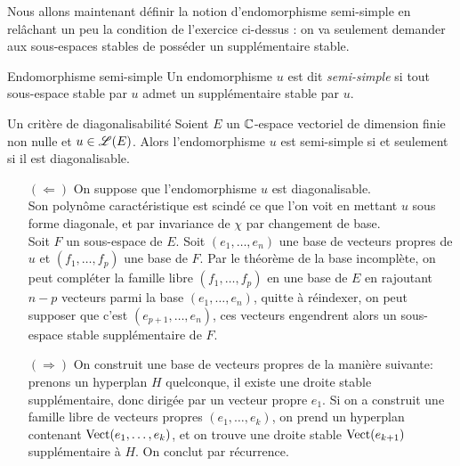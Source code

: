 Nous allons maintenant définir la notion d'endomorphisme semi-simple en relâchant un peu la
condition de l'exercice ci-dessus : on va seulement demander aux sous-espaces stables de posséder
un supplémentaire stable.

\begin{defi}{Endomorphisme semi-simple}
    Un endomorphisme $u$ est dit \emph{semi-simple} si tout sous-espace stable par $u$ admet un supplémentaire stable par $u$.
\end{defi}

\begin{prop}{Un critère de diagonalisabilité}
    Soient $E$ un $\mathbb{C}$-espace vectoriel de dimension finie non nulle et $u \in \mathscr{L}(E)$. Alors l'endomorphisme $u$ est semi-simple si et seulement si il est diagonalisable.
\end{prop}

\begin{preuve}
    \begin{itemize}
        \item[$(\Leftarrow)$] On suppose que l'endomorphisme $u$ est diagonalisable. \\
        Son polynôme caractéristique est scindé ce que l'on voit en mettant $u$ sous forme diagonale, et par invariance de $\chi$ par changement de base. \\
        Soit $F$ un sous-espace de $E$. Soit $(e_1, \dots, e_n)$ une base de vecteurs propres de $u$ et $(f_1, \dots, f_p)$ une base de $F$. Par le théorème de la base incomplète, on peut compléter la famille libre $(f_1, \dots, f_p)$ en une base de $E$ en rajoutant $n-p$ vecteurs parmi la base $(e_1, \dots, e_n)$, quitte à réindexer, on peut supposer que c'est $(e_{p+1}, \dots, e_n)$, ces vecteurs engendrent alors un sous-espace stable supplémentaire de $F$.
        \item[$(\Rightarrow)$] On construit une base de vecteurs propres de la manière suivante: prenons un hyperplan $H$ quelconque, il existe une droite stable supplémentaire, donc dirigée par un vecteur propre $e_1$. Si on a construit une famille libre de vecteurs propres $(e_1, \dots, e_k)$, on prend un hyperplan contenant $\mathrm{Vect}(e_1, \dots, e_k)$, et on trouve une droite stable $\mathrm{Vect}(e_{k+1})$ supplémentaire à $H$. On conclut par récurrence.
    \end{itemize}
\end{preuve}

